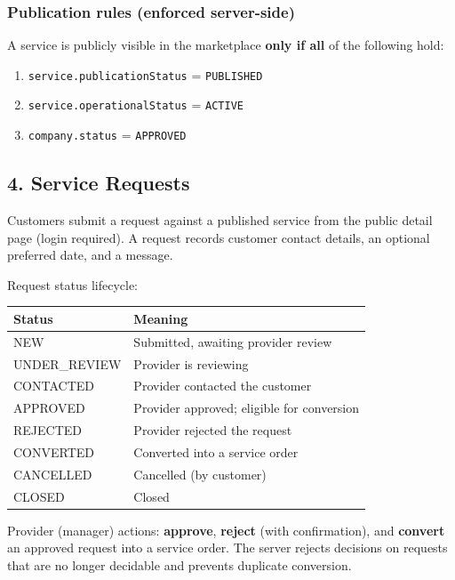 \documentclass[11pt,a4paper]{article}
\begin{document}
\subsubsection{Publication rules (enforced server-side)}
\label{sec:publication-rules}

A service is publicly visible in the marketplace \textbf{only if all} of the following hold:

\begin{enumerate}[leftmargin=2em, itemsep=2pt]
  \item \texttt{service.publicationStatus} = \texttt{PUBLISHED}
  \item \texttt{service.operationalStatus} = \texttt{ACTIVE}
  \item \texttt{company.status} = \texttt{APPROVED}
\end{enumerate}

\subsection{4. Service Requests}
\label{sec:requests}

Customers submit a request against a published service from the public detail page (login required). A request records customer contact details, an optional preferred date, and a message.

Request status lifecycle:

\begin{longtable}{@{}L{3.2cm}L{11.2cm}@{}}
  \toprule
  \textbf{Status} & \textbf{Meaning} \\
  \midrule
  \endhead
  NEW & Submitted, awaiting provider review \\
  UNDER\_REVIEW & Provider is reviewing \\
  CONTACTED & Provider contacted the customer \\
  APPROVED & Provider approved; eligible for conversion \\
  REJECTED & Provider rejected the request \\
  CONVERTED & Converted into a service order \\
  CANCELLED & Cancelled (by customer) \\
  CLOSED & Closed \\
  \bottomrule
\end{longtable}

Provider (manager) actions: \textbf{approve}, \textbf{reject} (with confirmation), and \textbf{convert} an approved request into a service order. The server rejects decisions on requests that are no longer decidable and prevents duplicate conversion.
\end{document}
